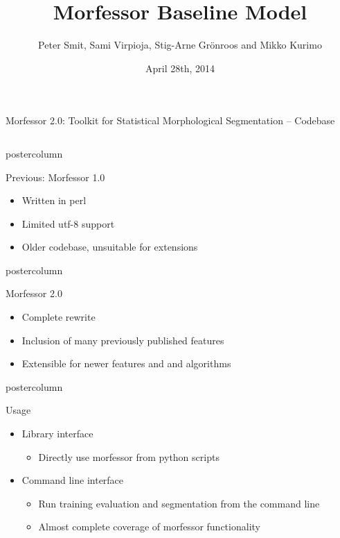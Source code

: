 \documentclass[final]{beamer} %
\title[Morfessor Model]{Morfessor Baseline Model}
\author[Smit et. al]{Peter Smit, Sami Virpioja, Stig-Arne Grönroos and Mikko Kurimo}
\institute[Aalto University]{Aalto University}
\date{April 28th, 2014}
\begin{document}
  \begin{frame}{Morfessor 2.0: Toolkit for Statistical Morphological Segmentation -- Codebase} 
\begin{columns}

\begin{column}{.3\textwidth}

      \begin{beamercolorbox}[center,wd=\textwidth]{postercolumn}
 \begin{block}{Previous: Morfessor 1.0}
                \begin{itemize}
                \item Written in perl
		\item Limited utf-8 support
		\item Older codebase, unsuitable for extensions

                \end{itemize}          
            \end{block}
            
	\end{beamercolorbox}

      \begin{beamercolorbox}[center,wd=\textwidth]{postercolumn}
 \begin{block}{Morfessor 2.0}
                \begin{itemize}
                \item Complete rewrite
		\item Inclusion of many previously published features
		\item Extensible for newer features and and algorithms
                \end{itemize}          
            \end{block}
            
	\end{beamercolorbox}


      \begin{beamercolorbox}[center,wd=\textwidth]{postercolumn}
 \begin{block}{Usage}
              \begin{itemize}
              \item Library interface
                \begin{itemize}
                \item Directly use morfessor from python scripts
                \end{itemize}
              \item Command line interface
                \begin{itemize}
                \item Run training evaluation and segmentation from the command line
                \item Almost complete coverage of morfessor functionality
                \end{itemize}
              \end{itemize}              
            \end{block}
            

\end{beamercolorbox}
\end{column}
\end{columns}
\end{frame}
\end{document}
